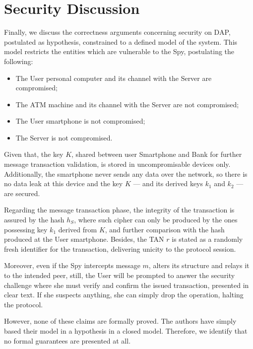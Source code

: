 \section{Security Discussion}
Finally, we discuss the correctness arguments concerning security on DAP, postulated as hypothesis, constrained to a defined model of the system. This model restricts the entities which are vulnerable to the Spy, postulating the following:

\begin{itemize}
  \item The User personal computer and its channel with the Server are compromised;
  \item The ATM machine and its channel with the Server are not compromised;
  \item The User smartphone is not compromised;
  \item The Server is not compromised.
\end{itemize}

Given that, the key \(K\), shared between user Smartphone and Bank for further message transaction validation, is stored in uncompromisable devices only. Additionally, the smartphone never sends any data over the network, so there is no data leak at this device and the key \(K\) --- and its derived keys \(k_1\) and \(k_2\) --- are secured.

Regarding the message transaction phase, the integrity of the transaction is assured by the hash \(h_S\), where such cipher can only be produced by the ones possessing key \(k_1\) derived from \(K\), and further comparison with the hash produced at the User smartphone. Besides, the TAN \(r\) is stated as a randomly fresh identifier for the transaction, delivering unicity to the protocol session.

Moreover, even if the Spy intercepts message \(m\), alters its structure and relays it to the intended peer, still, the User will be prompted to answer the security challenge where she must verify and confirm the issued transaction, presented in clear text. If she suspects anything, she can simply drop the operation, halting the protocol.

However, none of these claims are formally proved. The authors have simply based their model in a hypothesis in a closed model. Therefore, we identify that no formal guarantees are presented at all.
